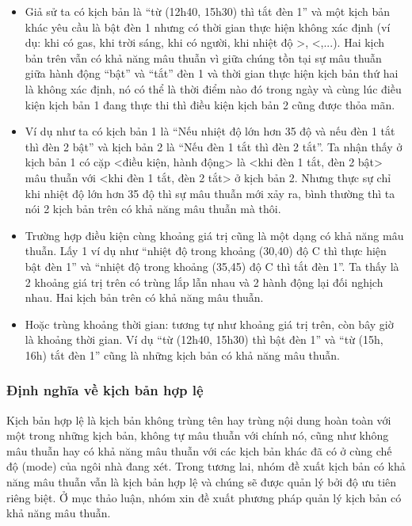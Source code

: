 \documentclass[12pt,a4paper,oneside]{extbook}
\begin{document}
	\begin{itemize}[topsep=1mm,itemsep=-0.5mm]
	\item Giả sử ta có kịch bản là “từ (12h40, 15h30) thì tắt đèn 1” và một kịch bản khác yêu cầu là bật đèn 1 nhưng có thời gian thực hiện không xác định (ví dụ: khi có gas, khi trời sáng, khi có người, khi nhiệt độ >, <,...). Hai kịch bản trên vẫn có khả năng mâu thuẫn vì giữa chúng tồn tại sự mâu thuẫn giữa hành động “bật” và “tắt” đèn 1 và thời gian thực hiện kịch bản thứ hai là không xác định, nó có thể là thời điểm nào đó trong ngày và cùng lúc điều kiện kịch bản 1 đang thực thi thì điều kiện kịch bản 2 cũng được thỏa mãn.
	\item Ví dụ như ta có kịch bản 1 là “Nếu nhiệt độ lớn hơn 35 độ và nếu đèn 1 tắt thì đèn 2 bật” và kịch bản 2 là “Nếu đèn 1 tắt thì đèn 2 tắt”. Ta nhận thấy ở kịch bản 1 có cặp <điều kiện, hành động> là <khi đèn 1 tắt, đèn 2 bật> mâu thuẫn với <khi đèn 1 tắt, đèn 2 tắt> ở kịch bản 2. Nhưng thực sự chỉ khi nhiệt độ lớn hơn 35 độ thì sự mâu thuẫn mới xảy ra, bình thường thì ta nói 2 kịch bản trên có khả năng mâu thuẫn mà thôi. 
	\item Trường hợp điều kiện cùng khoảng giá trị cũng là một dạng có khả năng mâu thuẫn. Lấy 1 ví dụ như “nhiệt độ trong khoảng (30,40) độ C thì thực hiện bật đèn 1” và “nhiệt độ trong khoảng (35,45) độ C thì tắt đèn 1”. Ta thấy là 2 khoảng giá trị trên có trùng lắp lẫn nhau và 2 hành động lại đối nghịch nhau. Hai kịch bản trên có khả năng mâu thuẫn.
	\item Hoặc trùng khoảng thời gian: tương tự như khoảng giá trị trên, còn bây giờ là khoảng thời gian. Ví dụ “từ (12h40, 15h30) thì bật đèn 1” và “từ (15h, 16h) tắt đèn 1” cũng là những kịch bản có khả năng mâu thuẫn.
	\vspace{1mm}
	\end{itemize}
	
\subsubsection{Định nghĩa về kịch bản hợp lệ}

Kịch bản hợp lệ là kịch bản không trùng tên hay trùng nội dung hoàn toàn với một trong những kịch bản, không tự mâu thuẫn với chính nó, cũng như không mâu thuẫn hay có khả năng mâu thuẫn với các kịch bản khác đã có ở cùng chế độ (mode) của ngôi nhà đang xét. Trong tương lai, nhóm đề xuất kịch bản có khả năng mâu thuẫn vẫn là kịch bản hợp lệ và chúng sẽ được quản lý bởi độ ưu tiên riêng biệt. Ở mục thảo luận, nhóm xin đề xuất phương pháp quản lý kịch bản có khả năng mâu thuẫn.
\end{document}
